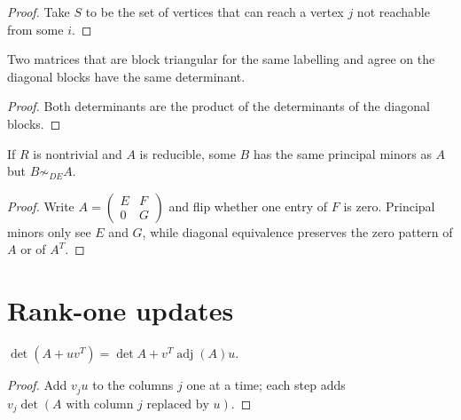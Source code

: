 \begin{proof}
\leanok
Take $S$ to be the set of vertices that can reach a vertex $j$ not reachable from some $i$.
\end{proof}

\begin{lemma}
\label{lem:blocktri-det}
\leanok
Two matrices that are block triangular for the same labelling and agree on the diagonal
blocks have the same determinant.
\end{lemma}

\begin{proof}
\leanok
Both determinants are the product of the determinants of the diagonal blocks.
\end{proof}

\begin{theorem}
\label{thm:reducible-fiber}
\leanok
{}
If $R$ is nontrivial and $A$ is reducible, some $B$ has the same principal minors as $A$ but
$B\not\sim_{DE}A$.
\end{theorem}

\begin{proof}
\leanok
{}
Write $A=\begin{pmatrix}E&F\\0&G\end{pmatrix}$ and flip whether one entry of $F$ is zero.
Principal minors only see $E$ and $G$, while diagonal equivalence preserves the zero pattern
of $A$ or of $A^T$.
\end{proof}

\chapter{Rank-one updates}

\begin{lemma}
\label{lem:det-add-vecMulVec}
\leanok
$\det(A+uv^T)=\det A+v^T\operatorname{adj}(A)u$.
\end{lemma}

\begin{proof}
\leanok
Add $v_ju$ to the columns $j$ one at a time; each step adds $v_j\det(A\text{ with column }j
\text{ replaced by }u)$.
\end{proof}

